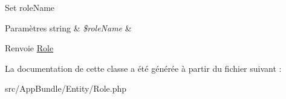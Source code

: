 Set role\+Name


\begin{DoxyParams}[1]{Paramètres}
string & {\em \$role\+Name} & \\
\hline
\end{DoxyParams}
\begin{DoxyReturn}{Renvoie}
\hyperlink{classAppBundle_1_1Entity_1_1Role}{Role} 
\end{DoxyReturn}


La documentation de cette classe a été générée à partir du fichier suivant \+:\begin{DoxyCompactItemize}
\item 
src/\+App\+Bundle/\+Entity/Role.\+php\end{DoxyCompactItemize}
